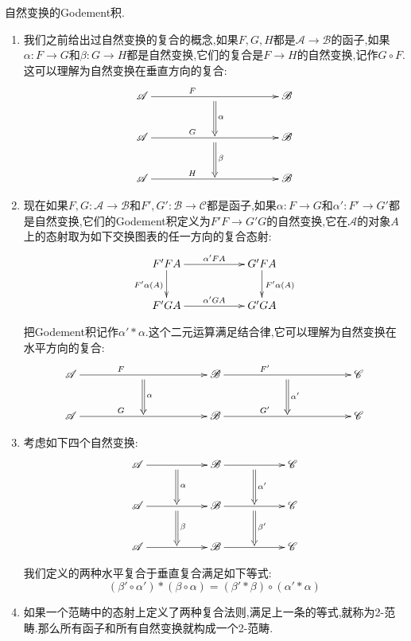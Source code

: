 自然变换的Godement积.
\begin{enumerate}
	\item 我们之前给出过自然变换的复合的概念,如果$F,G,H$都是$\mathscr{A}\to\mathscr{B}$的函子,如果$\alpha:F\to G$和$\beta:G\to H$都是自然变换,它们的复合是$F\to H$的自然变换,记作$G\circ F$.这可以理解为自然变换在垂直方向的复合:
	$$\xymatrix{\mathscr{A}\ar[rrrr]^{F\qquad\qquad}&&\ar@{=>}[d]^{\alpha}&&\mathscr{B}\\\mathscr{A}\ar[rrrr]^{G\qquad\qquad}&&\ar@{=>}[d]^{\beta}&&\mathscr{B}\\\mathscr{A}\ar[rrrr]^{H\qquad\qquad}&&&&\mathscr{B}}$$
	\item 现在如果$F,G:\mathscr{A}\to\mathscr{B}$和$F',G':\mathscr{B}\to\mathscr{C}$都是函子,如果$\alpha:F\to G$和$\alpha':F'\to G'$都是自然变换,它们的Godement积定义为$F'F\to G'G$的自然变换,它在$\mathscr{A}$的对象$A$上的态射取为如下交换图表的任一方向的复合态射:
	$$\xymatrix{F'FA\ar[rr]^{\alpha'FA}\ar[d]_{F'\alpha(A)}&&G'FA\ar[d]^{F'\alpha(A)}\\F'GA\ar[rr]^{\alpha' GA}&&G'GA}$$
	
	把Godement积记作$\alpha'\ast\alpha$.这个二元运算满足结合律,它可以理解为自然变换在水平方向的复合:
	$$\xymatrix{\mathscr{A}\ar[rrrr]^{F\qquad\qquad}&&\ar@{=>}[d]^{\alpha}&&\mathscr{B}\ar[rrrr]^{F'\qquad\qquad}&&\ar@{=>}[d]^{\alpha'}&&\mathscr{C}\\\mathscr{A}\ar[rrrr]^{G\qquad\qquad}&&&&\mathscr{B}\ar[rrrr]^{G'\qquad\qquad}&&&&\mathscr{C}}$$
	\item 考虑如下四个自然变换:
	$$\xymatrix{\mathscr{A}\ar[rr]&\ar@{=>}[d]^{\alpha}&\mathscr{B}\ar[rr]&\ar@{=>}[d]^{\alpha'}&\mathscr{C}\\\mathscr{A}\ar[rr]&\ar@{=>}[d]^{\beta}&\mathscr{B}\ar[rr]&\ar@{=>}[d]^{\beta'}&\mathscr{C}\\\mathscr{A}\ar[rr]&&\mathscr{B}\ar[rr]&&\mathscr{C}}$$
	
	我们定义的两种水平复合于垂直复合满足如下等式:
	$$\left(\beta'\circ\alpha'\right)\ast\left(\beta\circ\alpha\right)=\left(\beta'\ast\beta\right)\circ\left(\alpha'\ast\alpha\right)$$
	\item 如果一个范畴中的态射上定义了两种复合法则,满足上一条的等式,就称为2-范畴.那么所有函子和所有自然变换就构成一个2-范畴.
\end{enumerate}

